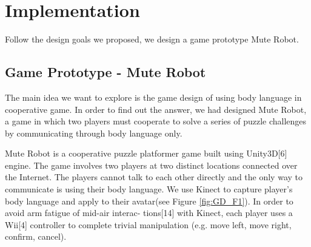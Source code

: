 \documentclass{sigchi}
\begin{document}
\section{Implementation}

Follow the design goals we proposed, we design a game prototype Mute Robot.

\subsection{Game Prototype - Mute Robot}

The main idea we want to explore is the game design of using body language in cooperative game. In order to find out the answer, we had designed Mute Robot, a game in which two players must cooperate to solve a series of puzzle challenges by communicating through body language only.

Mute Robot is a cooperative puzzle platformer game built using Unity3D[6] engine. The game involves two players at two distinct locations connected over the Internet. The players cannot talk to each other directly and the only way to communicate is using their body language. We use Kinect to capture player’s body language and apply to their avatar(see Figure \ref{fig:GD_F1}). In order to avoid arm fatigue of mid-air interac- tions[14] with Kinect, each player uses a Wii[4] controller to complete trivial manipulation (e.g. move left, move right, confirm, cancel).  
\end{document}
